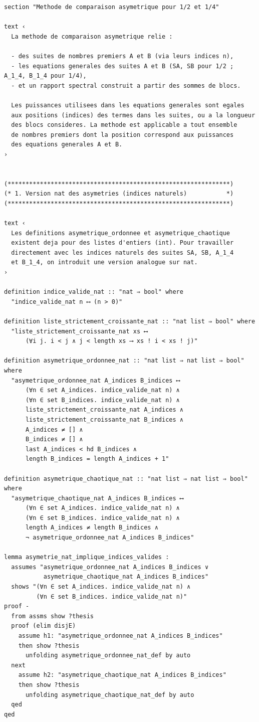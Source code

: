 \documentclass[a4paper,11pt]{article}
\begin{document}
\begin{holcode}[title={\textcolor{white}{File: methode\_spectral.thy -- Part 1/4}}]
\begin{lstlisting}
section "Methode de comparaison asymetrique pour 1/2 et 1/4"

text ‹
  La methode de comparaison asymetrique relie :

  - des suites de nombres premiers A et B (via leurs indices n),
  - les equations generales des suites A et B (SA, SB pour 1/2 ; A_1_4, B_1_4 pour 1/4),
  - et un rapport spectral construit a partir des sommes de blocs.

  Les puissances utilisees dans les equations generales sont egales
  aux positions (indices) des termes dans les suites, ou a la longueur
  des blocs consideres. La methode est applicable a tout ensemble
  de nombres premiers dont la position correspond aux puissances
  des equations generales A et B.
›


(**************************************************************)
(* 1. Version nat des asymetries (indices naturels)           *)
(**************************************************************)

text ‹
  Les definitions asymetrique_ordonnee et asymetrique_chaotique
  existent deja pour des listes d'entiers (int). Pour travailler
  directement avec les indices naturels des suites SA, SB, A_1_4
  et B_1_4, on introduit une version analogue sur nat.
›

definition indice_valide_nat :: "nat ⇒ bool" where
  "indice_valide_nat n ⟷ (n > 0)"

definition liste_strictement_croissante_nat :: "nat list ⇒ bool" where
  "liste_strictement_croissante_nat xs ⟷
      (∀i j. i < j ∧ j < length xs ⟶ xs ! i < xs ! j)"

definition asymetrique_ordonnee_nat :: "nat list ⇒ nat list ⇒ bool" where
  "asymetrique_ordonnee_nat A_indices B_indices ⟷
      (∀n ∈ set A_indices. indice_valide_nat n) ∧
      (∀n ∈ set B_indices. indice_valide_nat n) ∧
      liste_strictement_croissante_nat A_indices ∧
      liste_strictement_croissante_nat B_indices ∧
      A_indices ≠ [] ∧
      B_indices ≠ [] ∧
      last A_indices < hd B_indices ∧
      length B_indices = length A_indices + 1"

definition asymetrique_chaotique_nat :: "nat list ⇒ nat list ⇒ bool" where
  "asymetrique_chaotique_nat A_indices B_indices ⟷
      (∀n ∈ set A_indices. indice_valide_nat n) ∧
      (∀n ∈ set B_indices. indice_valide_nat n) ∧
      length A_indices ≠ length B_indices ∧
      ¬ asymetrique_ordonnee_nat A_indices B_indices"

lemma asymetrie_nat_implique_indices_valides :
  assumes "asymetrique_ordonnee_nat A_indices B_indices ∨
           asymetrique_chaotique_nat A_indices B_indices"
  shows "(∀n ∈ set A_indices. indice_valide_nat n) ∧
         (∀n ∈ set B_indices. indice_valide_nat n)"
proof -
  from assms show ?thesis
  proof (elim disjE)
    assume h1: "asymetrique_ordonnee_nat A_indices B_indices"
    then show ?thesis
      unfolding asymetrique_ordonnee_nat_def by auto
  next
    assume h2: "asymetrique_chaotique_nat A_indices B_indices"
    then show ?thesis
      unfolding asymetrique_chaotique_nat_def by auto
  qed
qed



\end{lstlisting}
\end{holcode}
\end{document}

